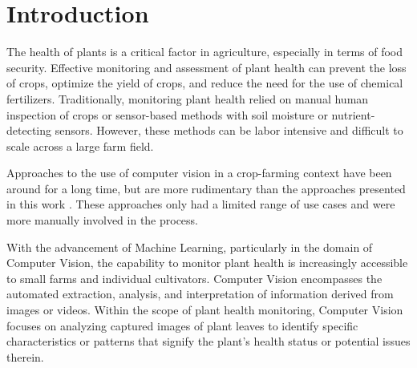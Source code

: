 \documentclass[draft,final]{vutinfth} %
\begin{document}
\begin{kurzfassung}
\end{kurzfassung}

\begin{abstract}
\end{abstract}


\tableofcontents %

\mainmatter

\chapter{Introduction}
The health of plants is a critical factor in agriculture, especially in terms of food security. Effective monitoring and assessment of plant health can prevent the loss of crops, optimize the yield of crops, and reduce the need for the use of chemical fertilizers. Traditionally, monitoring plant health relied on manual human inspection of crops or sensor-based methods with soil moisture or nutrient-detecting sensors. However, these methods can be labor intensive and difficult to scale across a large farm field.

Approaches to the use of computer vision in a crop-farming context have been around for a long time, but are more rudimentary than the approaches presented in this work \cite{cunha_application_2003}. These approaches only had a limited range of use cases and were more manually involved in the process. 

With the advancement of Machine Learning, particularly in the domain of Computer Vision, the capability to monitor plant health is increasingly accessible to small farms and individual cultivators. Computer Vision encompasses the automated extraction, analysis, and interpretation of information derived from images or videos. Within the scope of plant health monitoring, Computer Vision focuses on analyzing captured images of plant leaves to identify specific characteristics or patterns that signify the plant's health status or potential issues therein.
\end{document}
